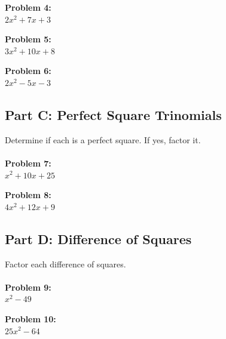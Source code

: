 \documentclass[12pt]{article}
\begin{document}
			\textbf{Problem 4:}\\
            
            $2x^2 + 7x + 3$

			\vspace{4cm}

			\textbf{Problem 5:}\\
            
            $3x^2 + 10x + 8$

			\vspace{4cm}

			\textbf{Problem 6:}\\
            
            $2x^2 - 5x - 3$

			\newpage

		\subsection*{Part C: Perfect Square Trinomials}

			Determine if each is a perfect square. If yes, factor it.\\\\

			\textbf{Problem 7:}\\
            
            $x^2 + 10x + 25$

			\vspace{4cm}

			\textbf{Problem 8:}\\
            
            $4x^2 + 12x + 9$

			\newpage

		\subsection*{Part D: Difference of Squares}

			Factor each difference of squares.\\\\

			\textbf{Problem 9:}\\
            
            $x^2 - 49$

			\vspace{4cm}

			\textbf{Problem 10:}\\
            
            $25x^2 - 64$
\end{document}
